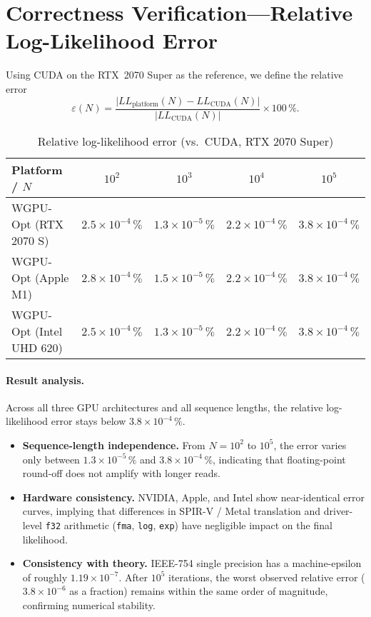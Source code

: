 \documentclass[PhD]{PHlab-thesis}
\begin{document}
\section{Correctness Verification—Relative Log-Likelihood Error}
Using CUDA on the RTX~2070 Super as the reference, we define the relative error
\[
  \varepsilon(N)=
  \frac{\lvert LL_{\text{platform}}(N)-LL_{\text{CUDA}}(N)\rvert}
       {\lvert LL_{\text{CUDA}}(N)\rvert}\times100\,\%.
\]

\begin{table}[h]
  \centering
  \caption{Relative log-likelihood error (vs.\ CUDA, RTX 2070 Super)}
  \label{tab:likelihood_error}
  \setlength{\tabcolsep}{6pt}
  \renewcommand{\arraystretch}{1.6}
  \small
  \begin{tabularx}{\textwidth}{@{}X c c c c@{}}
    \toprule
    Platform / $N$      & $10^{2}$ & $10^{3}$ & $10^{4}$ & $10^{5}$ \\
    \midrule
    WGPU-Opt (RTX 2070 S)  & $2.5\times10^{-4}\,\%$ & $1.3\times10^{-5}\,\%$ & $2.2\times10^{-4}\,\%$ & $3.8\times10^{-4}\,\%$ \\
    WGPU-Opt (Apple M1)    & $2.8\times10^{-4}\,\%$ & $1.5\times10^{-5}\,\%$ & $2.2\times10^{-4}\,\%$ & $3.8\times10^{-4}\,\%$ \\
    WGPU-Opt (Intel UHD 620)& $2.5\times10^{-4}\,\%$ & $1.3\times10^{-5}\,\%$ & $2.2\times10^{-4}\,\%$ & $3.8\times10^{-4}\,\%$ \\
    \bottomrule
  \end{tabularx}
\end{table}

\paragraph{Result analysis.}
Across all three GPU architectures and all sequence lengths, the relative log-likelihood error stays below $3.8\times10^{-4}\,\%$.
\begin{itemize}
  \item \textbf{Sequence-length independence.} From $N=10^{2}$ to $10^{5}$, the error varies only between $1.3\times10^{-5}\,\%$ and $3.8\times10^{-4}\,\%$, indicating that floating-point round-off does not amplify with longer reads.
  \item \textbf{Hardware consistency.} NVIDIA, Apple, and Intel show near-identical error curves, implying that differences in SPIR-V / Metal translation and driver-level \texttt{f32} arithmetic (\texttt{fma}, \texttt{log}, \texttt{exp}) have negligible impact on the final likelihood.
  \item \textbf{Consistency with theory.} IEEE-754 single precision has a machine-epsilon of roughly $1.19\times10^{-7}$. After $10^{5}$ iterations, the worst observed relative error ($3.8\times10^{-6}$ as a fraction) remains within the same order of magnitude, confirming numerical stability.
\end{itemize}
\end{document}
